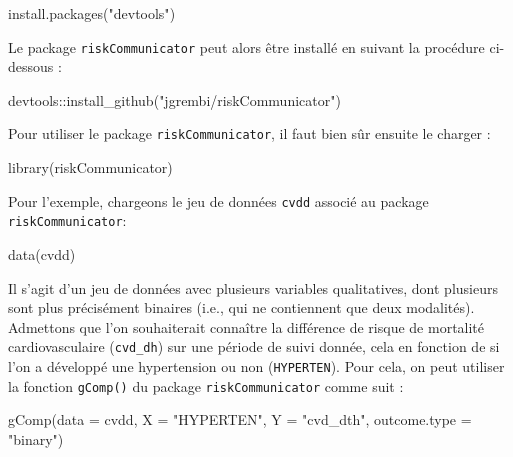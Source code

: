 \documentclass[
]{book}
\newenvironment{Shaded}{\begin{snugshade}}{\end{snugshade}}
\newcommand{\AttributeTok}[1]{\textcolor[rgb]{0.77,0.63,0.00}{#1}}
\newcommand{\FunctionTok}[1]{\textcolor[rgb]{0.00,0.00,0.00}{#1}}
\newcommand{\NormalTok}[1]{#1}
\newcommand{\SpecialCharTok}[1]{\textcolor[rgb]{0.00,0.00,0.00}{#1}}
\newcommand{\StringTok}[1]{\textcolor[rgb]{0.31,0.60,0.02}{#1}}
\begin{document}
\begin{Shaded}
\begin{Highlighting}[]
\FunctionTok{install.packages}\NormalTok{(}\StringTok{"devtools"}\NormalTok{)}
\end{Highlighting}
\end{Shaded}

Le package \texttt{riskCommunicator} peut alors être installé en suivant la procédure ci-dessous :

\begin{Shaded}
\begin{Highlighting}[]
\NormalTok{devtools}\SpecialCharTok{::}\FunctionTok{install\_github}\NormalTok{(}\StringTok{"jgrembi/riskCommunicator"}\NormalTok{)}
\end{Highlighting}
\end{Shaded}

Pour utiliser le package \texttt{riskCommunicator}, il faut bien sûr ensuite le charger :

\begin{Shaded}
\begin{Highlighting}[]
\FunctionTok{library}\NormalTok{(riskCommunicator)}
\end{Highlighting}
\end{Shaded}

Pour l'exemple, chargeons le jeu de données \texttt{cvdd} associé au package \texttt{riskCommunicator}:

\begin{Shaded}
\begin{Highlighting}[]
\FunctionTok{data}\NormalTok{(cvdd)}
\end{Highlighting}
\end{Shaded}

Il s'agit d'un jeu de données avec plusieurs variables qualitatives, dont plusieurs sont plus précisément binaires (i.e., qui ne contiennent que deux modalités). Admettons que l'on souhaiterait connaître la différence de risque de mortalité cardiovasculaire (\texttt{cvd\_dh}) sur une période de suivi donnée, cela en fonction de si l'on a développé une hypertension ou non (\texttt{HYPERTEN}). Pour cela, on peut utiliser la fonction \texttt{gComp()} du package \texttt{riskCommunicator} comme suit :

\begin{Shaded}
\begin{Highlighting}[]
\FunctionTok{gComp}\NormalTok{(}\AttributeTok{data =}\NormalTok{ cvdd, }\AttributeTok{X =} \StringTok{"HYPERTEN"}\NormalTok{, }\AttributeTok{Y =} \StringTok{"cvd\_dth"}\NormalTok{, }\AttributeTok{outcome.type =} \StringTok{"binary"}\NormalTok{)}
\end{Highlighting}
\end{Shaded}
\end{document}
